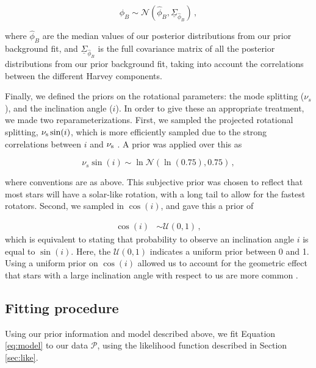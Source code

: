 \documentclass[12pt]{article}
\begin{document}
\begin{equation}
	\phi_{B}\sim\mathcal{N}(\hat{\phi}_{B},\underline{\Sigma}_{\hat{\phi}_{B}})\, ,
\end{equation}

\noindent where $\hat{\phi}_B$ are the median values of our posterior distributions from our prior background fit, and $\underline{\Sigma}_{\hat{\phi}_{B}}$ is the full covariance matrix of all the posterior distributions from our prior background fit, taking into account the correlations between the different Harvey components.

Finally, we defined the priors on the rotational parameters: the mode splitting ($\nu_s$), and the inclination angle ($i$). In order to give these an appropriate treatment, we made two reparameterizations. First, we sampled the projected rotational splitting, $\nu_{\rm{s}}\sin(i)$, which is more efficiently sampled due to the strong correlations between $i$ and $\nu_{\rm s}$ \cite{ballot+2006,ballot+2008a}. A prior was applied over this as

\begin{equation}
	\nu_s\sin(i) \sim \ln\mathcal{N}(\ln(0.75), 0.75)\, ,
\end{equation}

\noindent where conventions are as above. This subjective prior was chosen to reflect that most stars will have a solar-like rotation, with a long tail to allow for the fastest rotators. Second, we sampled in $\cos(i)$, and gave this a prior of

\begin{equation}
	\begin{split}
		\cos(i) &\sim \mathcal{U}(0, 1)\, ,
	\end{split}
\end{equation}
which is equivalent to stating that probability to observe an inclination angle $i$ is equal to $\sin(i)$. Here, the $\mathcal{U}(0,1)$ indicates a uniform prior between 0 and 1. Using a uniform prior on $\cos(i)$ allowed us to account for the geometric effect that stars with a large inclination angle with respect to us are more common \cite{chaplin+basu2017}.

\subsection{Fitting procedure}
Using our prior information and model described above, we fit Equation \ref{eq:model} to our data $\mathcal{P}$, using the likelihood function described in Section \ref{sec:like}.
\end{document}
